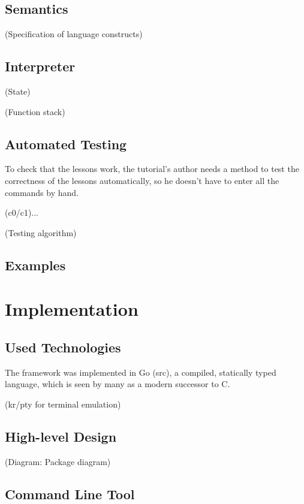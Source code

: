 \documentclass[twoside]{scrreprt}
\begin{document}
\section{Semantics}

(Specification of language constructs)

\section{Interpreter}

(State)

(Function stack)

\section{Automated Testing}

To check that the lessons work, the tutorial's author needs a method to test the correctness of the lessons automatically, so he doesn't have to enter all the commands by hand.

(c0/c1)...

(Testing algorithm)

\section{Examples}

\chapter{Implementation}

\section{Used Technologies}

The framework was implemented in Go (src), a compiled, statically typed language, which is seen by many as a modern successor to C.

(kr/pty for terminal emulation)

\section{High-level Design}

(Diagram: Package diagram)

\section{Command Line Tool}
\end{document}
